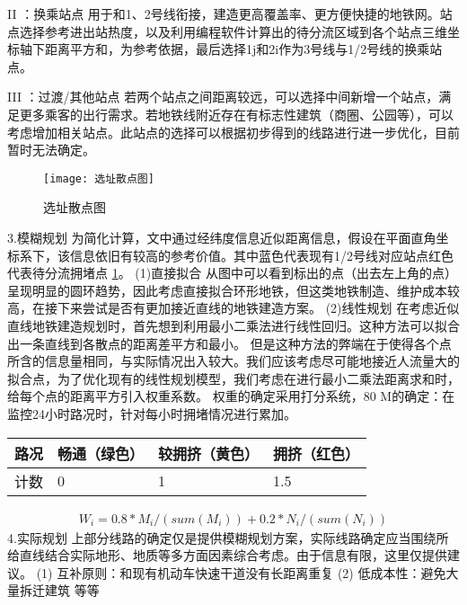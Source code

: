 \documentclass[12pt,a4paper]{mcmthesis}
\begin{document}
II ：换乘站点
用于和1、2号线衔接，建造更高覆盖率、更方便快捷的地铁网。站点选择参考进出站热度，以及利用编程软件计算出的待分流区域到各个站点三维坐标轴下距离平方和，为参考依据，最后选择1j和2i作为3号线与1/2号线的换乘站点。

III ：过渡/其他站点
若两个站点之间距离较远，可以选择中间新增一个站点，满足更多乘客的出行需求。若地铁线附近存在有标志性建筑（商圈、公园等），可以考虑增加相关站点。此站点的选择可以根据初步得到的线路进行进一步优化，目前暂时无法确定。


\begin{figure}[h!t]
	\centerline{\texttt{[image: 选址散点图]}\quad
	}
	\caption{\song\wuhao
		选址散点图}
	\label{fig:选址散点图}
\end{figure}

3.模糊规划
为简化计算，文中通过经纬度信息近似距离信息，假设在平面直角坐标系下，该信息依旧有较高的参考价值。其中蓝色代表现有1/2号线对应站点红色代表待分流拥堵点 \ref{fig:选址散点图}。
(1)直接拟合
从图中可以看到标出的点（出去左上角的点）呈现明显的圆环趋势，因此考虑直接拟合环形地铁，但这类地铁制造、维护成本较高，在接下来尝试是否有更加接近直线的地铁建造方案。
(2)线性规划
在考虑近似直线地铁建造规划时，首先想到利用最小二乘法进行线性回归。这种方法可以拟合出一条直线到各散点的距离差平方和最小。
但是这种方法的弊端在于使得各个点所含的信息量相同，与实际情况出入较大。我们应该考虑尽可能地接近人流量大的拟合点，为了优化现有的线性规划模型，我们考虑在进行最小二乘法距离求和时，给每个点的距离平方引入权重系数。
权重的确定采用打分系统，80%
M的确定：在监控24小时路况时，针对每小时拥堵情况进行累加。
\begin{table}
	\centering
	\begin{tabular}{|l|l|l|l|}
		\hline
		路况 & 畅通（绿色） & 较拥挤（黄色） & 拥挤（红色） \\ \hline
		计数 & 0 & 1 & 1.5 \\ \hline
	\end{tabular}
\end{table}
\begin{equation}
	\begin{aligned}
		W_i=0.8*M_i/(sum(M_i))+0.2*N_i/(sum(N_i))
	\end{aligned}
\end{equation}
4.实际规划
上部分线路的确定仅是提供模糊规划方案，实际线路确定应当围绕所给直线结合实际地形、地质等多方面因素综合考虑。由于信息有限，这里仅提供建议。
(1)	互补原则：和现有机动车快速干道没有长距离重复
(2)	低成本性：避免大量拆迁建筑
等等
\end{document}
